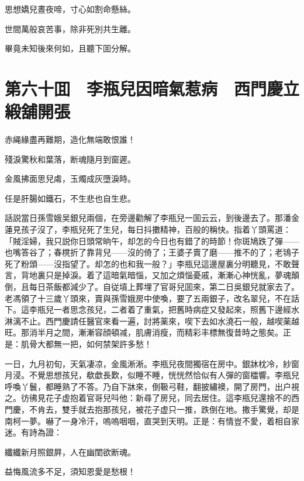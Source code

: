 思想嬌兒晝夜啼，寸心如割命懸絲。

世間萬般哀苦事，除非死別共生離。

畢竟未知後來何如，且聽下囬分解。

\chapter*{第六十囬　李瓶兒因暗氣惹病　西門慶立緞舖開張}

赤䋲緣盡再難期，造化無端敢恨誰！

殘淚驚秋和葉落，断魂隨月到窗遲。

金風拂面思兒䖏，玉燭成灰墮淚時。

任是肝腸如鐵石，不生悲也自生悲。

話説當日孫雪娥吴銀兒兩個，在旁邊勸解了李瓶兒一囬云云，到後邊去了。那潘金蓮見孩子沒了，李瓶兒死了生兒，每日抖擻精神，百般的稱快。指着丫頭罵道：「賊淫婦，我只説你日頭常晌午，却怎的今日也有錯了的時節！你斑鳩跌了彈——也嘴答谷了；春櫈折了靠背兒——沒的倚了；王婆子賣了磨——推不的了；老鴇子死了粉頭——沒指望了。却怎的也和我一般？」李瓶兒這邊屋裏分明聽見，不敢聲言，背地裏只是掉淚。着了這暗氣暗惱，又加之煩惱憂戚，漸漸心神恍亂，夢魂顛倒，且每日茶飯都減少了。自従墳上葬埋了官哥兒囬來，第二日吳銀兒就家去了。老馮領了十三歲丫頭來，賣與孫雪娥房中使喚，要了五兩銀子，改名翠兒，不在話下。這李瓶兒一者思念孩兒，二者着了重氣，把舊時病症又發起來，照舊下邊經水淋漓不止。西門慶請任醫官來看一遍，討將薬來，喫下去如水澆石一般，越喫薬越旺。那消半月之間，漸漸容顔頓减，肌膚消瘦，而精彩丰標無復昔時之態矣。正是：肌骨大都無一把，如何禁架許多愁！

一日，九月初旬，天氣凄凉，金風淅淅。李瓶兒夜間獨宿在房中。銀牀枕冷，紗窗月浸。不覺思想孩兒，欷歔長歎，似睡不睡，恍恍然恰似有人彈的窗櫺響。李瓶兒呼喚丫鬟，都睡熟了不答。乃自下牀來，倒靸弓鞋，翻披繡襖，開了房門，出户視之。彷彿見花子虚抱着官哥兒呌他：新尋了房兒，同去居住。這李瓶兒還捨不的西門慶，不肯去，雙手就去抱那孩兒，被花子虚只一推，跌倒在地。撒手驚覺，却是南柯一夢。嚇了一身冷汗，嗚嗚咽咽，直哭到天明。正是：有情豈不愛，着相自家迷。有詩為證：

纖纖新月照銀屛，人在幽閨欲断魂。

益悔風流多不足，須知恩愛是愁根！

